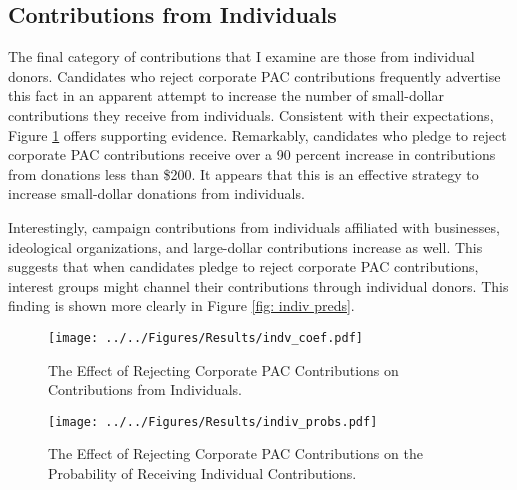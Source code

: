\documentclass[12pt]{article}
\begin{document}
\subsection{Contributions from Individuals}

The final category of contributions that I examine are those from individual donors. Candidates who reject corporate PAC contributions frequently advertise this fact in an apparent attempt to increase the number of small-dollar contributions they receive from individuals. Consistent with their expectations, Figure \ref{fig: indiv coefs} offers supporting evidence. Remarkably, candidates who pledge to reject corporate PAC contributions receive over a 90 percent increase in contributions from donations less than \$200. It appears that this is an effective strategy to increase small-dollar donations from individuals. 

Interestingly, campaign contributions from individuals affiliated with businesses, ideological organizations, and large-dollar contributions increase as well. This suggests that when candidates pledge to reject corporate PAC contributions, interest groups might channel their contributions through individual donors. This finding is shown more clearly in Figure \ref{fig: indiv preds}. 

\begin{figure*}[!htb]
    \centering
    \begin{subfigure}[b]{0.65\textwidth}
        \centering
        \texttt{[image: ../../Figures/Results/indv\_coef.pdf]}
        \caption{The Effect of Rejecting Corporate PAC Contributions on Contributions from Individuals.}
        \label{fig: indiv coefs}
    \end{subfigure}
    
    \begin{subfigure}[b]{0.65\textwidth}
        \centering
        \texttt{[image: ../../Figures/Results/indiv\_probs.pdf]}
        \caption{The Effect of Rejecting Corporate PAC Contributions on the Probability of Receiving Individual Contributions.}
        \label{fig: indiv probs}
    \end{subfigure}
    \caption{\textbf{The Effect of Rejecting Corporate PAC Contributions on Contributions and the Probability of Receiving Money from Individuals.} These figures present the posterior distributions estimated for a candidate that pledges to reject corporate PAC contributions. The dot shows the median coefficient estimate and the intervals show the 50\% and 89\% highest density intervals. Figure \ref{fig: indiv coefs} shows that candidates that pledge to reject corporate PAC contributions experience an increase in contributions from small-dollar, total, ideological, large-dollar, and business individual contributions. Figure \ref{fig: indiv probs} shows that rejecting corporate PAC contributions has no effect on the probability of receiving contributions from individuals affiliated with labor or ideological interest groups. See Table \ref{tbl: indiv results} for the formal estimates.}
    \label{fig: indiv results}
\end{figure*}
\end{document}
